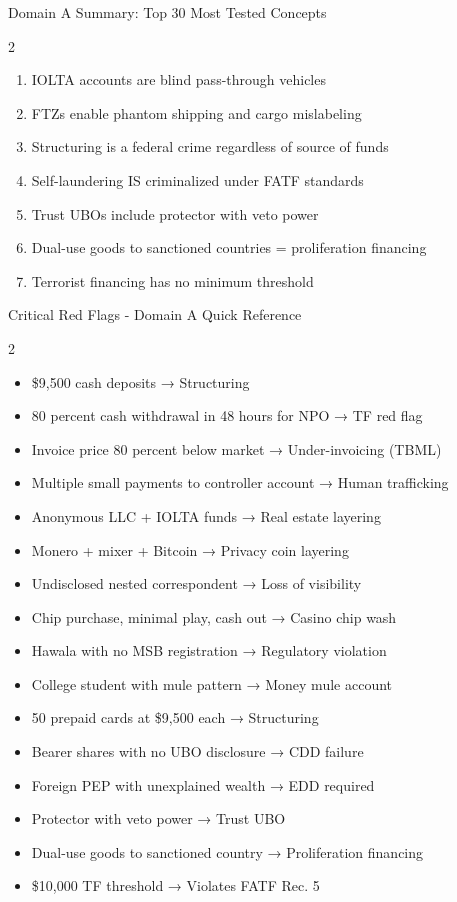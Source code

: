 \documentclass[11pt,a4paper]{beamer}
\begin{document}
\begin{frame}{Domain A Summary: Top 30 Most Tested Concepts}
\begin{multicols}{2}
\begin{enumerate}
				\item IOLTA accounts are blind pass-through vehicles
				\item FTZs enable phantom shipping and cargo mislabeling
				\item Structuring is a federal crime regardless of source of funds
				\item Self-laundering IS criminalized under FATF standards
				\item Trust UBOs include protector with veto power
				\item Dual-use goods to sanctioned countries = proliferation financing
				\item Terrorist financing has no minimum threshold
			\end{enumerate}
		\end{multicols}
	\end{frame}
	
	\begin{frame}{Critical Red Flags - Domain A Quick Reference}
		\begin{multicols}{2}
			\begin{itemize}
				\item \$9,500 cash deposits → Structuring
				\item 80 percent cash withdrawal in 48 hours for NPO → TF red flag
				\item Invoice price 80 percent below market → Under-invoicing (TBML)
				\item Multiple small payments to controller account → Human trafficking
				\item Anonymous LLC + IOLTA funds → Real estate layering
				\item Monero + mixer + Bitcoin → Privacy coin layering
				\item Undisclosed nested correspondent → Loss of visibility
				\item Chip purchase, minimal play, cash out → Casino chip wash
				\item Hawala with no MSB registration → Regulatory violation
				\item College student with mule pattern → Money mule account
				\item 50 prepaid cards at \$9,500 each → Structuring
				\item Bearer shares with no UBO disclosure → CDD failure
				\item Foreign PEP with unexplained wealth → EDD required
				\item Protector with veto power → Trust UBO
				\item Dual-use goods to sanctioned country → Proliferation financing
				\item \$10,000 TF threshold → Violates FATF Rec. 5
			\end{itemize}
		\end{multicols}
	\end{frame}
	
\end{document}
